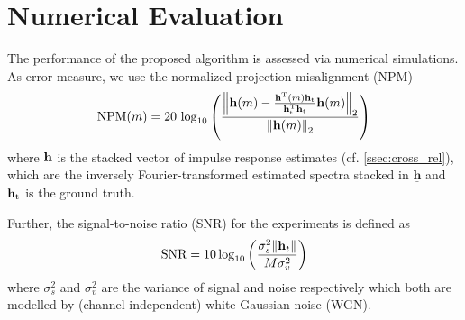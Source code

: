 \documentclass{article}
\newcommand{\h}{\mtxb{h}}
\newcommand{\hf}{\underline{\bm{h}}}
\begin{document}
\section{Numerical Evaluation}
\label{sec:perf_eval}

The performance of the proposed algorithm is assessed via numerical simulations.
As error measure, we use the normalized projection misalignment (NPM) \cite{huangClassFrequencydomainAdaptive2003}
\begin{equation}
    \text{NPM}(m) = 20\,\log_{10} \left(\frac{\left\| \h(m) - \frac{\h^\T (m) \h_{\text{t}}}{\h_{\text{t}}^\T \h_{\text{t}}}\h(m) \right\|_2}{\left\|\h(m)\right\|_2} \right)
\end{equation}
where \(\h\) is the stacked vector of impulse response estimates (cf. \autoref{ssec:cross_rel}), which are the inversely Fourier-transformed estimated spectra stacked in \(\hf\) and \(\h_{\text{t}}\) is the ground truth.

Further, the signal-to-noise ratio (SNR) for the experiments is defined as 
\begin{equation}
    \text{SNR} = 10 \log_{10} \left(\frac{\sigma_s^2 \| \h_t \|}{M \sigma_v^2} \right)
\end{equation}
where \(\sigma_s^2\) and \(\sigma_v^2\) are the variance of signal and noise respectively which both are modelled by (channel-independent) white Gaussian noise (WGN).
\end{document}
